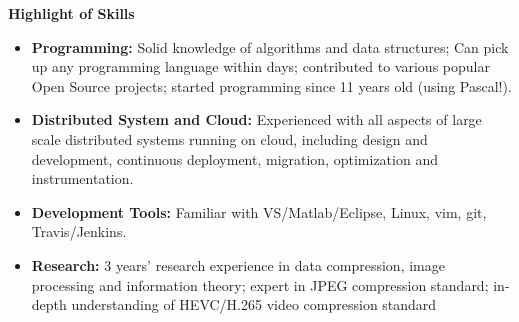 \documentclass[letterpaper,10pt]{article}
\newcommand{\resheading}[1]{{\large \colorbox{mygrey}{\begin{minipage}{\textwidth}{\textbf{#1 \vphantom{p\^{E}}}}\end{minipage}}}}
\begin{document}
\resheading{Highlight of Skills}
\begin{itemize}
\itemsep0em
\item {\textbf {Programming:}} Solid knowledge of algorithms and data structures; Can pick up any programming language within days; contributed to various popular Open Source projects; started programming since 11 years old (using Pascal!).
\item{\textbf {Distributed System and Cloud:}} Experienced with all aspects of large scale distributed systems running on cloud, including design and development, continuous deployment, migration, optimization and instrumentation.
\item{\textbf {Development Tools:}} Familiar with VS/Matlab/Eclipse, Linux, vim, git, Travis/Jenkins.
\item{\textbf {Research:}} 3 years' research experience in data compression, image processing and information theory; expert in JPEG compression standard; in-depth understanding of HEVC/H.265 video compression standard

\end{itemize}
\end{document}
